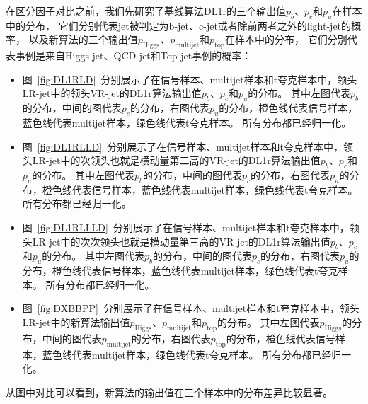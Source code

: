 在区分因子对比之前，我们先研究了基线算法DL1r的三个输出值$p_b$、$p_c$和$p_u$在样本中的分布，
它们分别代表jet被判定为b-jet、c-jet或者除前两者之外的light-jet的概率，
以及新算法的三个输出值$p_{\text{Higgs}}$、$p_{\text{multijet}}$和$p_{\text{top}}$在样本中的分布，
它们分别代表事例是来自Higgs-jet、QCD-jet和Top-jet事例的概率：
\begin{itemize}
\item 图~\ref{fig:DL1RLD}~分别展示了在信号样本、multijet样本和t夸克样本中，领头LR-jet中的领头VR-jet的DL1r算法输出值$p_b$、$p_c$和$p_u$的分布。
其中左图代表$p_b$的分布，中间的图代表$p_c$的分布，右图代表$p_u$的分布，橙色线代表信号样本，蓝色线代表multijet样本，绿色线代表t夸克样本。
所有分布都已经归一化。
\item 图~\ref{fig:DL1RLLD}~分别展示了在信号样本、multijet样本和t夸克样本中，领头LR-jet中的次领头也就是横动量第二高的VR-jet的DL1r算法输出值$p_b$、$p_c$和$p_u$的分布。
其中左图代表$p_b$的分布，中间的图代表$p_c$的分布，右图代表$p_u$的分布，橙色线代表信号样本，蓝色线代表multijet样本，绿色线代表t夸克样本。
所有分布都已经归一化。
\item 图~\ref{fig:DL1RLLLD}~分别展示了在信号样本、multijet样本和t夸克样本中，领头LR-jet中的次次领头也就是横动量第三高的VR-jet的DL1r算法输出值$p_b$、$p_c$和$p_u$的分布。
其中左图代表$p_b$的分布，中间的图代表$p_c$的分布，右图代表$p_u$的分布，橙色线代表信号样本，蓝色线代表multijet样本，绿色线代表t夸克样本。
所有分布都已经归一化。
\item 图~\ref{fig:DXBBPP}~分别展示了在信号样本、multijet样本和t夸克样本中，领头LR-jet中的新算法输出值$p_{\text{Higgs}}$、$p_{\text{multijet}}$和$p_{\text{top}}$的分布。
其中左图代表$p_{\text{Higgs}}$的分布，中间的图代表$p_{\text{multijet}}$的分布，右图代表$p_{\text{top}}$的分布，橙色线代表信号样本，蓝色线代表multijet样本，绿色线代表t夸克样本。
所有分布都已经归一化。
\end{itemize}
从图中对比可以看到，新算法的输出值在三个样本中的分布差异比较显著。

